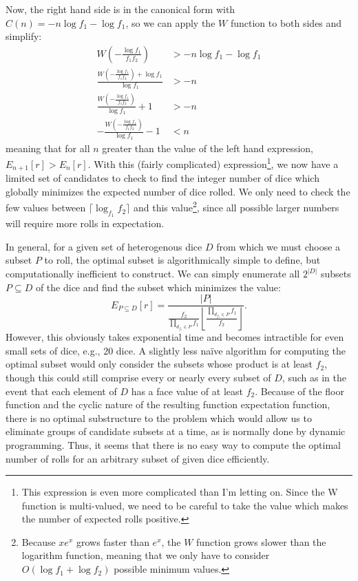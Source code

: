 \documentclass{article}
\begin{document}
Now, the right hand side is in the canonical form with $C(n) = -n\log{f_1}-\log{f_1}$, so we can apply the $W$ function to both sides and simplify:
\begin{align}
    W\left(-\frac{\log{f_1}}{f_1f_2}\right) &> -n\log{f_1}-\log{f_1}\\
    \frac{W\left(-\frac{\log{f_1}}{f_1f_2}\right) + \log{f_1}}{\log{f_1}} &> -n\\
    \frac{W\left(-\frac{\log{f_1}}{f_1f_2}\right)}{\log{f_1}} + 1 &> -n\\
    -\frac{W\left(-\frac{\log{f_1}}{f_1f_2}\right)}{\log{f_1}} - 1 &< n
\end{align}
meaning that for all $n$ greater than the value of the left hand expression, $E_{n+1}[r] > E_n[r]$.
With this (fairly complicated) expression\footnote{This expression is even more complicated than I'm letting on. Since the W function is multi-valued, we need to be careful to take the value which makes the number of expected rolls positive.}, we now have a limited set of candidates to check to find the integer number of dice which globally minimizes the expected number of dice rolled.
We only need to check the few values between $\lceil \log_{f_1}{f_2} \rceil$ and this value\footnote{Because $xe^x$ grows faster than $e^x$, the $W$ function grows slower than the logarithm function, meaning that we only have to consider $O(\log{f_1} + \log{f_2})$ possible minimum values.}, since all possible larger numbers will require more rolls in expectation. %

\par In general, for a given set of heterogenous dice $D$ from which we must choose a subset $P$ to roll, the optimal subset is algorithmically simple to define, but computationally inefficient to construct.
We can simply enumerate all $2^{|D|}$ subsets $P \subseteq D$ of the dice and find the subset which minimizes the value: $$E_{P \subseteq D}[r] = \frac{|P|}{\frac{f_2}{\prod_{d_{f_1} \in P}{f_1}} \left\lfloor \frac{\prod_{d_{f_1} \in P}{f_1}}{f_2} \right\rfloor}.$$
However, this obviously takes exponential time and becomes intractible for even small sets of dice, e.g., 20 dice.
A slightly less na\"ive algorithm for computing the optimal subset would only consider the subsets whose product is at least $f_2$, though this could still comprise every or nearly every subset of $D$, such as in the event that each element of $D$ has a face value of at least $f_2$.
Because of the floor function and the cyclic nature of the resulting function expectation function, there is no optimal substructure to the problem which would allow us to eliminate groups of candidate subsets at a time, as is normally done by dynamic programming.
Thus, it seems that there is no easy way to compute the optimal number of rolls for an arbitrary subset of given dice efficiently.
\end{document}
